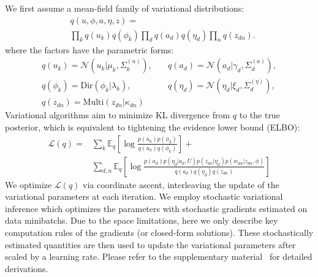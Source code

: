 \documentclass[sigconf]{acmart}
\newcommand{\E}{\mathbb{E}}
\renewcommand*{\bm}[1]{#1}%
\begin{document}
We first assume a mean-field family of variational distributions:
\begin{equation}
\begin{split}
&q(\bm{u},\bm{\phi},\bm{a},\bm{\eta},\bm{z}) = \\ &\prod\nolimits_{k}q(\bm{u}_k)q(\bm{\phi}_k) \prod\nolimits_{d}q(\bm{a}_d)q(\bm{\eta}_d)\prod\nolimits_n q(z_{dn}).
\end{split}
\end{equation}
where the factors have the parametric forms:
 \begin{equation}
 \begin{split}
 q(\bm{u}_k)=\mathcal{N}(\bm{u}_k|\bm{\mu}_k, \Sigma^{(u)}_{k}),&\quad q(\bm{a}_d)=\mathcal{N}(\bm{a}_d|\bm{\gamma}_d, \Sigma^{(a)}_{d}),\\
 q(\bm{\phi}_k) = \text{Dir}(\bm{\phi}_k|\bm{\lambda}_k),&\quad q(\bm{\eta}_d) = \mathcal{N}(\bm{\eta}_d|\bm{\xi}_d, \Sigma^{(\eta)}_{d}), \\
 q(z_{dn}) = \text{Multi}(z_{dn}|\bm{\kappa}_{dn})&
\end{split}
\label{eq:vi-factor}
\end{equation}
Variational algorithms aim to minimize KL divergence from $q$ to the true posterior, which is equivalent to tightening the evidence lower bound (ELBO):
\begin{equation}
\begin{split}
\mathcal{L}(q) = &\sum\nolimits_k \E_{q}\left[ \log \frac{p(\bm{u}_k)p(\bm{\phi}_k)}{q(\bm{u}_k)q(\bm{\phi}_k)}  \right] + \\
&\sum\nolimits_{d,n} \E_{q}\left[ \log \frac{p(\bm{a}_d) p(\bm{\eta}_d | \bm{a}_d, \bm{U}) p(z_{dn}|\bm{\eta}_d) p(w_{dn}|z_{dn},\bm{\phi})}{q(\bm{a}_d)q(\bm{\eta}_d)q(z_{dn})} \right] 
\end{split}
\end{equation}
We optimize $\mathcal{L}(q)$ via coordinate ascent, interleaving the update of the variational parameters at each iteration. We employ stochastic variational inference which optimizes the parameters with stochastic gradients estimated on data minibatchs. 
Due to the space limitations, here we only describe key computation rules of the gradients (or closed-form solutions). These stochastically estimated quantities are then used to update the variational parameters after scaled by a learning rate. Please refer to the supplementary material~\cite{supplement} for detailed derivations.
\end{document}
